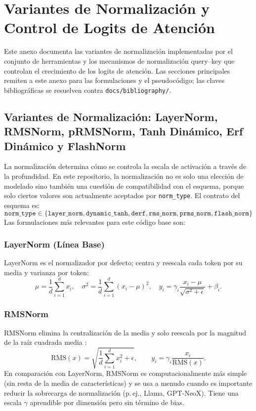 \section{Variantes de Normalización y Control de Logits de Atención}
\label{sec:annex-normalization}

Este anexo documenta las variantes de normalización implementadas por el conjunto de herramientas y los mecanismos de normalización query--key que controlan el crecimiento de los logits de atención. Las secciones principales remiten a este anexo para las formulaciones y el pseudocódigo; las claves bibliográficas se resuelven contra \texttt{docs/bibliography/}.

\subsection{Variantes de Normalización: LayerNorm, RMSNorm, pRMSNorm, Tanh Dinámico, Erf Dinámico y FlashNorm}

La normalización determina cómo se controla la escala de activación a través de la profundidad. En este repositorio, la normalización no es solo una elección de modelado sino también una cuestión de compatibilidad con el esquema, porque solo ciertos valores son actualmente aceptados por \texttt{norm\_type}. El contrato del esquema es:
\[
\texttt{norm\_type} \in \{\texttt{layer\_norm}, \texttt{dynamic\_tanh}, \texttt{derf}, \texttt{rms\_norm}, \texttt{prms\_norm}, \texttt{flash\_norm}\}
\]
Las formulaciones más relevantes para este código base son:

\subsubsection{LayerNorm (Línea Base)}
LayerNorm \citep{ba2016layer} es el normalizador por defecto; centra y reescala cada token por su media y varianza por token:
\[
\mu = \frac{1}{d}\sum_{i=1}^{d} x_i, \quad \sigma^2 = \frac{1}{d}\sum_{i=1}^{d}(x_i - \mu)^2, \quad y_i = \gamma_i \frac{x_i - \mu}{\sqrt{\sigma^2 + \epsilon}} + \beta_i.
\]

\subsubsection{RMSNorm}
RMSNorm elimina la centralización de la media y solo reescala por la magnitud de la raíz cuadrada media \citep{zhang_root_2019}:
\[
\mathrm{RMS}(x)=\sqrt{\frac{1}{d}\sum_{i=1}^{d}x_i^2+\epsilon},\qquad
y_i=\gamma_i\frac{x_i}{\mathrm{RMS}(x)}.
\]
En comparación con LayerNorm, RMSNorm es computacionalmente más simple (sin resta de la media de características) y se usa a menudo cuando es importante reducir la sobrecarga de normalización (p.\,ej., Llama, GPT-NeoX). Tiene una escala $\gamma$ aprendible por dimensión pero sin término de bias.

